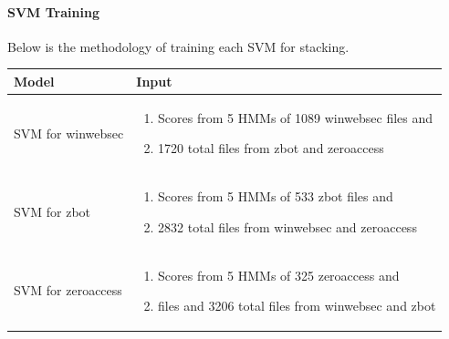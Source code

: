 \documentclass[12pt]{article}
\begin{document}
\paragraph{SVM Training}
Below is the methodology of training each SVM for stacking.
  \begin{table}[H]
    \centering
    \begin{tabular}{|l|p{}|}
    \hline \textbf{Model} & \textbf{Input} \\\hline \hline
    SVM for winwebsec   & 
        \begin{enumerate}
          \item Scores from 5 HMMs of 1089 winwebsec files and 
          \item 1720 total files from zbot and zeroaccess  
        \end{enumerate}  \\\hline
     SVM for zbot   & 
        \begin{enumerate}
          \item Scores from 5 HMMs of 533 zbot files and 
          \item 2832 total files from winwebsec and zeroaccess 
    \end{enumerate} \\\hline
     SVM for zeroaccess
     & 
        \begin{enumerate}
    \item Scores from 5 HMMs of 325 zeroaccess and
    \item files and 3206 total files from winwebsec and zbot          
  \end{enumerate}
  \\\hline
  \end{tabular}
  \end{table}  
\end{document}
